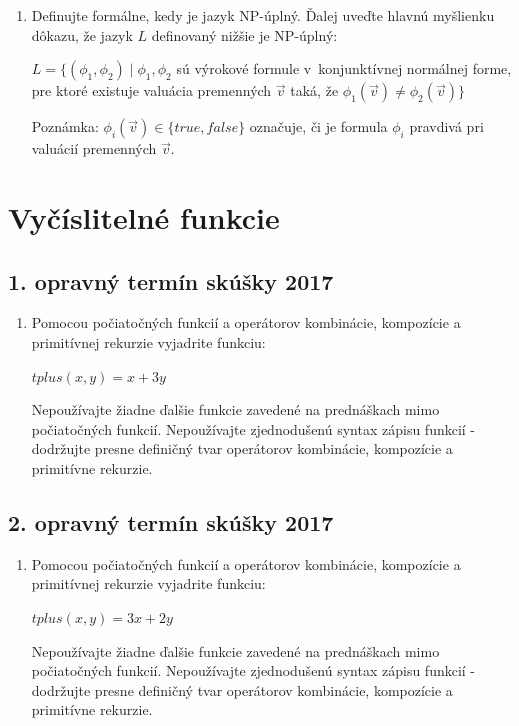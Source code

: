 \documentclass[11pt,a4paper]{article}
\begin{document}
		\begin{enumerate}
			\item Definujte formálne, kedy je jazyk NP-úplný. Ďalej uveďte hlavnú myšlienku dôkazu, že jazyk $L$ definovaný nižšie je NP-úplný:

			$L = \{(\phi_1, \phi_2) \mid \phi_1, \phi_2$ sú výrokové formule v~konjunktívnej normálnej forme, pre ktoré existuje valuácia premenných $\vec{v}$ taká, že $\phi_1(\vec{v}) \neq \phi_2(\vec{v})\}$
	
			Poznámka: $\phi_i(\vec{v}) \in \{true, false\}$ označuje, či je formula $\phi_i$ pravdivá pri valuácií premenných $\vec{v}$.
		\end{enumerate}	

	\section{Vyčíslitelné funkcie}

		\subsection{1. opravný termín skúšky 2017}

		\begin{enumerate}
			\item Pomocou počiatočných funkcií a operátorov kombinácie, kompozície a primitívnej rekurzie vyjadrite funkciu:

			$tplus(x,y) = x + 3y$
	
			Nepoužívajte žiadne ďalšie funkcie zavedené na prednáškach mimo počiatočných funkcií. Nepoužívajte zjednodušenú syntax zápisu funkcií \-- dodržujte presne definičný tvar operátorov kombinácie, kompozície a primitívne rekurzie.
		\end{enumerate}	

		\subsection{2. opravný termín skúšky 2017}

		\begin{enumerate}
			\item Pomocou počiatočných funkcií a operátorov kombinácie, kompozície a primitívnej rekurzie vyjadrite funkciu:

			$tplus(x,y) = 3x + 2y$
	
			Nepoužívajte žiadne ďalšie funkcie zavedené na prednáškach mimo počiatočných funkcií. Nepoužívajte zjednodušenú syntax zápisu funkcií \-- dodržujte presne definičný tvar operátorov kombinácie, kompozície a primitívne rekurzie.
		\end{enumerate}	
	
\end{document}
